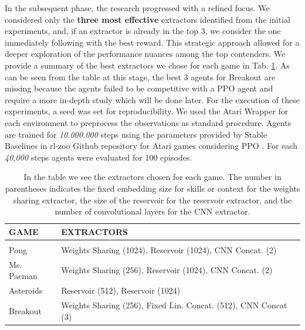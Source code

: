 

In the subsequent phase, the research progressed with a refined focus. We considered only the \textbf{three most effective} extractors identified from the initial experiments, and, if an extractor is already in the top 3, we consider the one immediately following with the best reward.
This strategic approach allowed for a deeper exploration of the performance nuances among the top contenders.
We provide a summary of the best extractors we chose for each game in Tab. \ref{tab:top3}.
As can be seen from the table at this stage, the best 3 agents for Breakout are missing because the agents failed to be competitive with a PPO agent and require a more in-depth study which will be done later.
For the execution of these experiments, a seed was set for reproducibility. We used the Atari Wrapper for each environment to preprocess the observations as standard procedure. Agents are trained for \textit{10.000.000} steps using the parameters provided by Stable Baselines in rl-zoo Github repository for Atari games considering PPO \cite{rl-zoo3}.
For each \textit{40,000} steps agents were evaluated for 100 episodes.

\begin{table}[htbp]
    \begin{center}
        \begin{tabular}{ll}
            \multicolumn{1}{l}{\bf GAME}  &\multicolumn{1}{l}{\bf EXTRACTORS}
            \\ \hline \\
            Pong       & Weights Sharing (1024), Reservoir (1024), CNN Concat. (2) \\
            Ms. Pacman & Weights Sharing (256), Reservoir (1024), CNN Concat. (2) \\
            Asteroids         & Reservoir (512), Reservoir (1024) \\
            Breakout          & Weights Sharing (256), Fixed Lin. Concat. (512), CNN Concat (3) \\
        \end{tabular}
    \end{center}
    \caption{In the table we see the extractors chosen for each game. The number in parentheses indicates the fixed embedding size for skills or context for the weights sharing extractor, the size of the reservoir for the reservoir extractor, and the number of convolutional layers for the CNN extractor.}
    \label{tab:top3}
\end{table}

